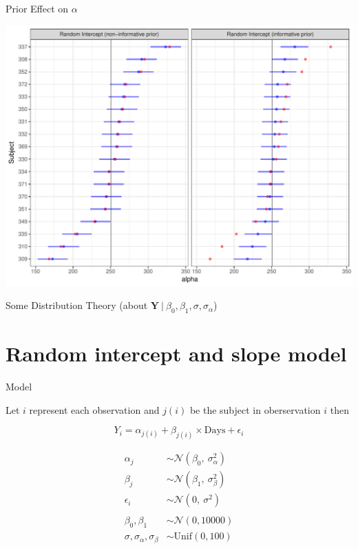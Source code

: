 \documentclass[11pt,ignorenonframetext,]{beamer}
\begin{document}
\begin{frame}{Prior Effect on \(\alpha\)}

\includegraphics{Lec5_files/figure-beamer/unnamed-chunk-30-1.pdf}

\end{frame}

\begin{frame}{Some Distribution Theory (about
\(\bm{Y} ~|~ \beta_0, \beta_1, \sigma, \sigma_\alpha\))}

\end{frame}

\section{Random intercept and slope
model}\label{random-intercept-and-slope-model}

\begin{frame}{Model}

Let \(i\) represent each observation and \(j(i)\) be the subject in
oberservation \(i\) then

\[ Y_i = \alpha_{j(i)}+ \beta_{j(i)} \times \text{Days} + \epsilon_i \]

\[
\begin{aligned}
\alpha_j &\sim \mathcal{N}(\beta_0,~\sigma^2_\alpha)  \\
\beta_j &\sim \mathcal{N}(\beta_1,~\sigma^2_\beta) \\
\epsilon_i &\sim \mathcal{N}(0,~\sigma^2) \\
\\
\beta_0, \beta_1 &\sim \mathcal{N}(0, 10000)\\
\sigma, \sigma_\alpha, \sigma_\beta &\sim \text{Unif}(0,100)
\end{aligned}
\]

\end{frame}
\end{document}
